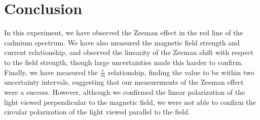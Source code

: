 \section{Conclusion}
\label{sec:conclusion}

In this experiment, we have observed the Zeeman effect in the red line of the cadmium spectrum. We have also measured the magnetic field strength and current relationship, and observed the linearity of the Zeeman shift with respect to the field strength, though large uncertainties made this harder to confirm. Finally, we have measured the $\frac{e}{m}$ relationship, finding the value to be within two uncertainty intervals, suggesting that our measurements of the Zeeman effect were a success. However, although we confirmed the linear polarization of the light viewed perpendicular to the magnetic field, we were not able to confirm the circular polarization of the light viewed parallel to the field.